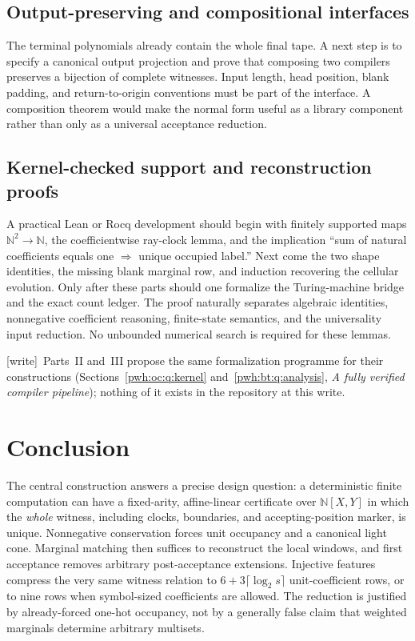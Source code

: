 \documentclass[11pt,letterpaper]{article}
\numberwithin{equation}{section}
\theoremstyle{definition}
\newcommand{\N}{\mathbb N}
\newcommand{\wtag}{\textup{[write]}}
\begin{document}
\subsection{Output-preserving and compositional interfaces}

The terminal polynomials already contain the whole final tape. A next
step is to specify a canonical output projection and prove that composing
two compilers preserves a bijection of complete witnesses. Input length,
head position, blank padding, and return-to-origin conventions must be
part of the interface. A composition theorem would make the normal form
useful as a library component rather than only as a universal acceptance
reduction.

\subsection{Kernel-checked support and reconstruction proofs}\label{pwh:uh:q:kernel}

A practical Lean or Rocq development should begin with finitely supported
maps $\N^2\to\N$, the coefficientwise ray-clock lemma, and the implication
``sum of natural coefficients equals one $\Rightarrow$ unique occupied
label.'' Next come the two shape identities, the missing blank marginal
row, and induction recovering the cellular evolution. Only after these
parts should one formalize the Turing-machine bridge and the exact count
ledger. The proof naturally separates algebraic identities, nonnegative
coefficient reasoning, finite-state semantics, and the universality input
reduction. No unbounded numerical search is required for these lemmas.

\wtag\ Parts~II and~III propose the same formalization programme for
their constructions (Sections~\ref{pwh:oc:q:kernel} and~\ref{pwh:bt:q:analysis},
\emph{A fully verified compiler pipeline}); nothing of it exists in the
repository at this write.

\section{Conclusion}

The central construction answers a precise design question: a deterministic
finite computation can have a fixed-arity, affine-linear certificate over
$\N[X,Y]$ in which the \emph{whole} witness, including clocks, boundaries,
and accepting-position marker, is unique. Nonnegative conservation forces
unit occupancy and a canonical light cone. Marginal matching then suffices
to reconstruct the local windows, and first acceptance removes arbitrary
post-acceptance extensions. Injective features compress the very same
witness relation to $6+3\lceil\log_2s\rceil$ unit-coefficient rows, or to
nine rows when symbol-sized coefficients are allowed. The reduction is
justified by already-forced one-hot occupancy, not by a generally false
claim that weighted marginals determine arbitrary multisets.
\end{document}
